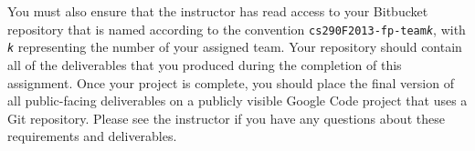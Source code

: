 \vspace*{-.1in}

You must also ensure that the instructor has read access to your Bitbucket repository that is named according to the
convention {\tt cs290F2013-fp-team{\em k}}, with {\tt {\em k}} representing the number of your assigned team.  Your
repository should contain all of the deliverables that you produced during the completion of this assignment.  Once your
project is complete, you should place the final version of all public-facing deliverables on a publicly visible Google
Code project that uses a Git repository. Please see the instructor if you have any questions about these requirements
and deliverables.


